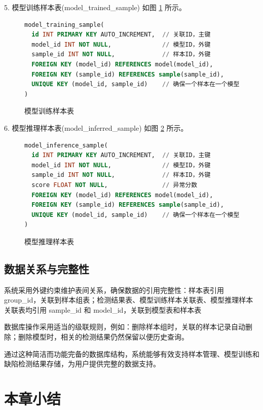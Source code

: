 \documentclass[
  ]{njuthesis}
\begin{document}
5. 模型训练样本表(model\_trained\_sample) 如图 \ref{模型训练样本表} 所示。

\begin{figure}[H]
    \caption{模型训练样本表}
    \label{模型训练样本表}
    \begin{lstlisting}[language=sql]
model_training_sample(
  id INT PRIMARY KEY AUTO_INCREMENT,  // 关联ID，主键
  model_id INT NOT NULL,              // 模型ID，外键
  sample_id INT NOT NULL,             // 样本ID，外键
  FOREIGN KEY (model_id) REFERENCES model(model_id),
  FOREIGN KEY (sample_id) REFERENCES sample(sample_id),
  UNIQUE KEY (model_id, sample_id)    // 确保一个样本在一个模型中只被训练一次
)
    \end{lstlisting}
\end{figure}

6. 模型推理样本表(model\_inferred\_sample) 如图 \ref{模型推理样本表} 所示。

\begin{figure}[H]
    \caption{模型推理样本表}
    \label{模型推理样本表}
    \begin{lstlisting}[language=sql]
model_inference_sample(
  id INT PRIMARY KEY AUTO_INCREMENT,  // 关联ID，主键
  model_id INT NOT NULL,              // 模型ID，外键
  sample_id INT NOT NULL,             // 样本ID，外键
  score FLOAT NOT NULL,               // 异常分数
  FOREIGN KEY (model_id) REFERENCES model(model_id),
  FOREIGN KEY (sample_id) REFERENCES sample(sample_id),
  UNIQUE KEY (model_id, sample_id)    // 确保一个样本在一个模型中只被记录一次
)
    \end{lstlisting}
\end{figure}

\subsection{数据关系与完整性}

系统采用外键约束维护表间关系，确保数据的引用完整性：样本表引用 group\_id，关联到样本组表；检测结果表、模型训练样本关联表、模型推理样本关联表均引用 sample\_id 和 model\_id，关联到模型表和样本表

数据库操作采用适当的级联规则，例如：删除样本组时，关联的样本记录自动删除；删除模型时，相关的检测结果仍然保留以便历史查询。

通过这种简洁而功能完备的数据库结构，系统能够有效支持样本管理、模型训练和缺陷检测结果存储，为用户提供完整的数据支持。

\section{本章小结}
\end{document}
